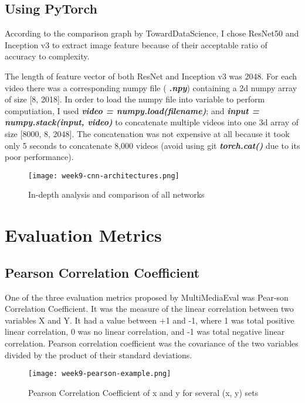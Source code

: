 \subsection{Using PyTorch}
According to the comparison graph by TowardDataScience, I chose ResNet50 and Inception v3 to extract image feature because of their acceptable ratio of accuracy to complexity.

The length of feature vector of both ResNet and Inception v3 was 2048. For each video there was a corresponding numpy file ( \textbf{\emph{.npy}}) containing a 2d numpy array of size [8, 2018]. In order to load the numpy file into variable to perform computiation, I used \textbf{\emph{video = numpy.load(filename)}}; and \textbf{\emph{input = numpy.stack(input, video)}} to concatenate multiple videos into one 3d array of size [8000, 8, 2048]. The concatenation was not expensive at all because it took only 5 seconds to concatenate 8,000 videos (avoid using git \textbf{\emph{torch.cat()}} due to its poor performance).

\newpage
\begin{figure}[!ht]
\centering
\texttt{[image: week9-cnn-architectures.png]}
\caption{In-depth analysis and comparison of all networks\cite{cnnarchitectures}}
\end{figure}

\section{Evaluation Metrics}
\subsection{Pearson Correlation Coefficient}
One of the three evaluation metrics proposed by MultiMediaEval was Pear-son Correlation Coefficient. It was the measure of the linear correlation between two variables X and Y. It had a value between +1 and -1, where 1 was total positive linear correlation, 0 was no linear correlation, and -1 was total negative linear correlation. Pearson correlation coefficient was the covariance of the two variables divided by the product of their standard deviations.

\begin{figure}[!ht]
\centering
\texttt{[image: week9-pearson-example.png]}
\caption{Pearson Correlation Coefficient of x and y for several (x, y) sets}
\end{figure}


